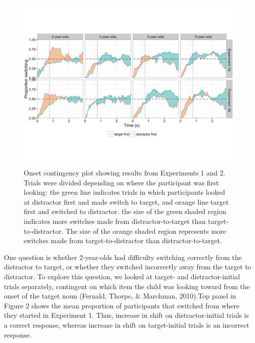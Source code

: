 \documentclass[a4paper,man,apacite,floatsintext]{apa6}
\newenvironment{CodeChunk}{}{}
\begin{document}
\begin{CodeChunk}
\begin{figure}[H]

{\centering \includegraphics{figs/et_ons-1} 

}

\caption[Onset contingency plot showing results from Experiments 1 and 2]{Onset contingency plot showing results from Experiments 1 and 2. Trials were divided depending on where the participant was first looking: the green line indicates trials in which participants looked at distractor first and made switch to target, and orange line target first and switched to distractor. the size of the green shaded region indicates more switches made from distractor-to-target than target-to-distractor. The size of the orange shaded region represents more switches made from target-to-distractor than distractor-to-target.}\label{fig:et_ons}
\end{figure}
\end{CodeChunk}

One question is whether 2-year-olds had difficulty switching correctly
from the distractor to target, or whether they switched incorrectly away
from the target to distractor. To explore this question, we looked at
target- and distractor-initial trials separately, contingent on which
item the child was looking toward from the onset of the target noun
(Fernald, Thorpe, \& Marchman, 2010).Top panel in Figure 2 shows the
mean proportion of participants that switched from where they started in
Experiment 1. Thus, increase in shift on distractor-initial trials is a
correct response, whereas increase in shift on target-initial trials is
an incorrect response.
\end{document}
